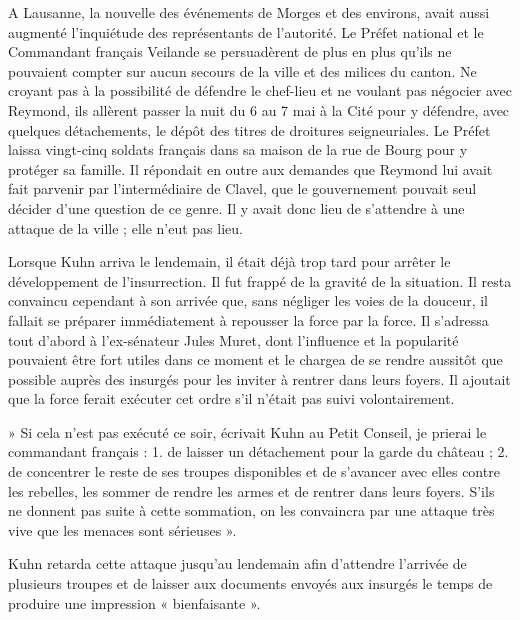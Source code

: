 \documentclass[french,twoside]{book} %
\begin{document}
\noindent A Lausanne, la nouvelle des événements de Morges et des environs, avait aussi augmenté l’inquiétude des représentants de l’autorité. Le Préfet national et le Commandant français Veilande se persuadèrent de plus en plus qu’ils ne pouvaient compter sur aucun secours de la ville et des milices du canton. Ne croyant pas à la possibilité de défendre le chef-lieu et ne voulant pas négocier avec Reymond, ils allèrent passer la nuit du 6 au 7 mai à la Cité pour y défendre, avec quelques détachements, le dépôt des titres de droitures seigneuriales. Le Préfet laissa vingt-cinq soldats français dans sa maison de la rue de Bourg pour y protéger sa famille. Il répondait en outre aux demandes que Reymond lui avait fait parvenir par l’intermédiaire de Clavel, que le gouvernement pouvait seul décider d’une question de ce genre. Il y avait donc lieu de s’attendre à une attaque de la ville ; elle n’eut pas lieu.\par
Lorsque Kuhn arriva le lendemain, il était déjà trop tard pour arrêter le développement de l’insurrection. Il fut frappé de la gravité de la situation. Il resta convaincu cependant à son arrivée que, sans négliger les voies de la douceur, il fallait se préparer immédiatement à repousser la force par la force. Il s’adressa tout d’abord à l’ex-sénateur Jules Muret, dont l’influence et la popularité pouvaient être fort utiles dans ce moment et le chargea de se rendre aussitôt que possible auprès des insurgés pour les inviter à rentrer dans leurs foyers. Il ajoutait que la force ferait exécuter cet ordre s’il n’était pas suivi volontairement.\par
» Si cela n’est pas exécuté ce soir, écrivait Kuhn au Petit Conseil, je prierai le commandant français : 1. de laisser un détachement pour la garde du château ; 2. de concentrer le reste de ses troupes disponibles et de s’avancer avec elles contre les rebelles, les sommer de rendre les armes et de rentrer dans leurs foyers. S’ils ne donnent pas suite à cette sommation, on les convaincra par une attaque très vive que les menaces sont sérieuses ».\par
Kuhn retarda cette attaque jusqu’au lendemain afin d’attendre l’arrivée de plusieurs troupes et de laisser aux documents envoyés aux insurgés le temps de produire une impression « bienfaisante ».\par
\end{document}
